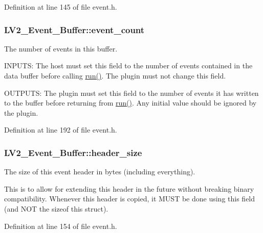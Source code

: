 Definition at line 145 of file event.\+h.

\subsubsection[{\texorpdfstring{event\+\_\+count}{event_count}}]{ L\+V2\+\_\+\+Event\+\_\+\+Buffer\+::event\+\_\+count}\hypertarget{struct_l_v2___event___buffer_a0de99fadad573a09ec67623e94cd2b96}{}\label{struct_l_v2___event___buffer_a0de99fadad573a09ec67623e94cd2b96}
The number of events in this buffer.

I\+N\+P\+U\+TS\+: The host must set this field to the number of events contained in the data buffer before calling \hyperlink{namespacewaflib_1_1_task_a859c6336afe027ae782f84b9e49a4f0f}{run()}. The plugin must not change this field.

O\+U\+T\+P\+U\+TS\+: The plugin must set this field to the number of events it has written to the buffer before returning from \hyperlink{namespacewaflib_1_1_task_a859c6336afe027ae782f84b9e49a4f0f}{run()}. Any initial value should be ignored by the plugin. 

Definition at line 192 of file event.\+h.

\subsubsection[{\texorpdfstring{header\+\_\+size}{header_size}}]{ L\+V2\+\_\+\+Event\+\_\+\+Buffer\+::header\+\_\+size}\hypertarget{struct_l_v2___event___buffer_ad4ac56627744b17134c2bef97752d891}{}\label{struct_l_v2___event___buffer_ad4ac56627744b17134c2bef97752d891}
The size of this event header in bytes (including everything).

This is to allow for extending this header in the future without breaking binary compatibility. Whenever this header is copied, it M\+U\+ST be done using this field (and N\+OT the sizeof this struct). 

Definition at line 154 of file event.\+h.

